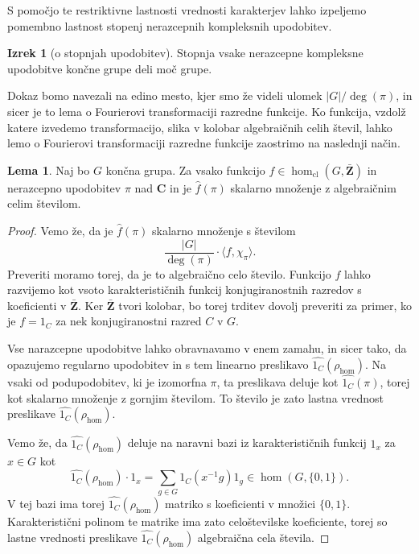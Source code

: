 \documentclass[11pt]{book}
\def\ZZ{\mathbf{Z}}
\def\CC{\mathbf{C}}
\def\conclass{C}
\DeclareMathOperator\cl{cl}
\theoremstyle{definition}
\theoremstyle{zgled}
\theoremstyle{odprtproblem}
\theoremstyle{domacanaloga}
\newenvironment{dokaz}
    {\color{siva}\begin{proof}}
    {\end{proof}}
\theoremstyle{izrek}
\newtheorem*{izrek}{Izrek}
\newtheorem*{lema}{Lema}
\begin{document}
S pomočjo te restriktivne lastnosti vrednosti karakterjev lahko izpeljemo pomembno lastnost stopenj nerazcepnih kompleksnih upodobitev.

\begin{izrek}[o stopnjah upodobitev]
Stopnja vsake nerazcepne kompleksne upodobitve končne grupe deli moč grupe.
\end{izrek}

Dokaz bomo navezali na edino mesto, kjer smo že videli ulomek $|G|/\deg(\pi)$, in sicer je to lema o Fourierovi transformaciji razredne funkcije. Ko funkcija, vzdolž katere izvedemo transformacijo, slika v kolobar algebraičnih celih števil, lahko lemo o Fourierovi transformaciji razredne funkcije zaostrimo na naslednji način.

    \begin{lema}
    Naj bo $G$ končna grupa. Za vsako funkcijo $f \in \hom_{\cl}(G, \bar{\ZZ})$ in nerazcepno upodobitev $\pi$ nad $\CC$ in je $\hat{f}(\pi)$ skalarno množenje z algebraičnim celim številom.
    \end{lema}
    \begin{dokaz}
    Vemo že, da je $\hat{f}(\pi)$ skalarno množenje s številom
    \[
        \frac{|G|}{\deg(\pi)} \cdot \langle f, \chi_{\pi} \rangle.
    \]
    Preveriti moramo torej, da je to algebraično celo število. Funkcijo $f$ lahko razvijemo kot vsoto karakterističnih funkcij konjugiranostnih razredov s koeficienti v $\bar{\ZZ}$. Ker $\bar{\ZZ}$ tvori kolobar, bo torej trditev dovolj preveriti za primer, ko je $f = 1_{\conclass}$ za nek konjugiranostni razred $\conclass$ v $G$.
    
    Vse narazcepne upodobitve lahko obravnavamo v enem zamahu, in sicer tako, da opazujemo regularno upodobitev in s tem linearno preslikavo $\widehat{1_{\conclass}}(\rho_{\hom})$. Na vsaki od podupodobitev, ki je izomorfna $\pi$, ta preslikava deluje kot $\widehat{1_{\conclass}}(\pi)$, torej kot skalarno množenje z gornjim številom. To število je zato lastna vrednost preslikave $\widehat{1_{\conclass}}(\rho_{\hom})$.
    
    Vemo že, da $\widehat{1_{\conclass}}(\rho_{\hom})$ deluje na naravni bazi iz karakterističnih funkcij $1_x$ za $x \in G$ kot
    \[
        \widehat{1_{\conclass}}(\rho_{\hom}) \cdot 1_x = \sum_{g \in G} 1_{\conclass}(x^{-1} g) 1_g \in \hom(G, \{ 0, 1 \}).
    \]
    V tej bazi ima torej $\widehat{1_{\conclass}}(\rho_{\hom})$ matriko s koeficienti v množici $\{ 0, 1 \}$. Karakteristični polinom te matrike ima zato celoštevilske koeficiente, torej so lastne vrednosti preslikave $\widehat{1_{\conclass}}(\rho_{\hom})$ algebraična cela števila.
    \end{dokaz}
    
\end{document}
